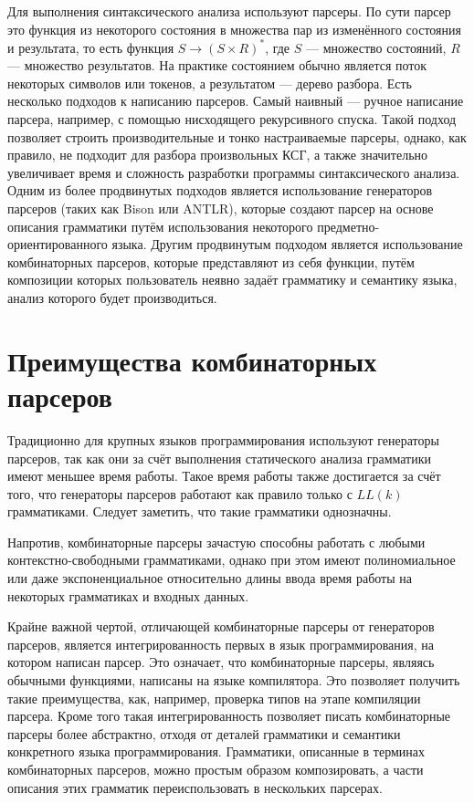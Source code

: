 \documentclass[times]{itmo-student-thesis}
\begin{document}
Для выполнения синтаксического анализа используют парсеры. По сути парсер это функция из некоторого состояния в
множества пар из изменённого состояния и результата, то есть функция $S \rightarrow (S \times R)^*$, где $S$
--- множество состояний, $R$ --- множество результатов. На практике состоянием обычно является поток
некоторых символов или токенов, а результатом --- дерево разбора. Есть несколько подходов к написанию парсеров. Самый
наивный --- ручное написание парсера, например, с помощью нисходящего рекурсивного спуска. Такой подход позволяет
строить производительные и тонко настраиваемые парсеры, однако, как правило, не подходит для разбора произвольных КСГ,
а также значительно увеличивает время и сложность разработки программы синтаксического анализа. Одним из более
продвинутых подходов является использование генераторов парсеров (таких как Bison\cite{bison} или
ANTLR\cite{antlr}), которые создают парсер на основе описания грамматики путём использования некоторого
предметно-ориентированного языка. Другим продвинутым подходом является использование комбинаторных парсеров, которые
представляют из себя функции, путём композиции которых пользователь неявно задаёт грамматику и семантику языка, анализ
которого будет производиться.

\section{Преимущества комбинаторных парсеров}\label{sec:parser_combinators_advantages}

Традиционно для крупных языков программирования используют генераторы парсеров, так как они за счёт выполнения
статического анализа грамматики имеют меньшее время работы. Такое время работы также достигается за счёт того, что
генераторы парсеров работают как правило только с $LL(k)$ грамматиками. Следует заметить, что такие
грамматики однозначны.

Напротив, комбинаторные парсеры зачастую способны работать с любыми контекстно-свободными грамматиками, однако при этом
имеют полиномиальное или даже экспоненциальное относительно длины ввода время работы на некоторых грамматиках и входных
данных.

Крайне важной чертой, отличающей  комбинаторные парсеры от генераторов парсеров, является интегрированность первых в
язык программирования, на котором написан парсер. Это означает, что комбинаторные парсеры, являясь обычными функциями,
написаны на языке компилятора. Это позволяет получить такие преимущества, как, например, проверка типов на этапе
компиляции парсера. Кроме того такая интегрированность позволяет писать комбинаторные парсеры более абстрактно, отходя
от деталей грамматики и семантики конкретного языка программирования. Грамматики, описанные в терминах комбинаторных
парсеров, можно простым образом композировать, а части описания этих грамматик переиспользовать в нескольких парсерах.
\end{document}
